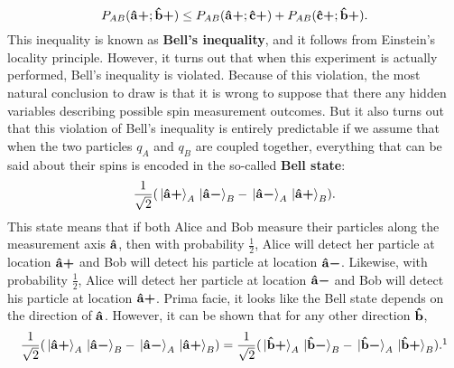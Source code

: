        \begin{equation}\label{bellinequality}
      P_{AB}(\vb{\hat{{a}}}\bm{+};\vb{\hat{{b}}}\bm{+})\leq P_{AB}(\vb{\hat{{a}}}\bm{+};\vb{\hat{{c}}}\bm{+})+P_{AB}(\vb{\hat{{c}}}\bm{+};\vb{\hat{{b}}}\bm{+}).
      \end{equation}
      This inequality is known as \textbf{Bell's inequality}, and it follows from Einstein's locality principle.  However, it turns out that when this experiment is actually performed, Bell's inequality is violated. Because of this violation, the most natural conclusion to draw is that it is wrong to suppose that there any hidden variables describing possible spin measurement outcomes. But it also turns out that this violation of Bell's inequality is entirely predictable if we assume that when the two particles $q_A$ and $q_B$ are coupled together, everything that can be said about their spins is encoded in the so-called \textbf{Bell state}: 
      \begin{equation}\label{bell}
      \frac{1}{\sqrt{2}}(\ket*{\vb{\hat{{a}}}\bm{+}}_A\ket*{\vb{\hat{{a}}}\bm{-}}_B-\ket*{\vb{\hat{{a}}}\bm{-}}_A\ket*{\vb{\hat{{a}}}\bm{+}}_B).\end{equation}
      This state means that if both Alice and Bob measure their particles along the measurement axis $\vb{\hat{{a}}}$, then with probability $\frac{1}{2}$, Alice will detect her particle at location $\vb{\hat{{a}}}\bm{+}$ and Bob will detect his particle at location $\vb{\hat{{a}}}\bm{-}$. Likewise, with probability $\frac{1}{2}$, Alice will detect her particle at location $\vb{\hat{{a}}}\bm{-}$ and Bob will detect his particle at location $\vb{\hat{{a}}}\bm{+}$. Prima facie, it looks like the Bell state depends on the direction of $\vb{\hat{{a}}}$. However, it can be shown that for any other direction $\vb{\hat{{b}}}$,
      \begin{equation}\label{bellstate2}\frac{1}{\sqrt{2}}(\ket*{\uvbp{a}}_A\ket*{\uvbm{a}}_B-\ket*{\uvbm{a}}_A\ket*{\uvbp{a}}_B)=\frac{1}{\sqrt{2}}(\ket*{\uvbp{b}}_A\ket*{\uvbm{b}}_B-\ket*{\uvbm{b}}_A\ket*{\uvbp{b}}_B).\protect\footnotemark\end{equation}

